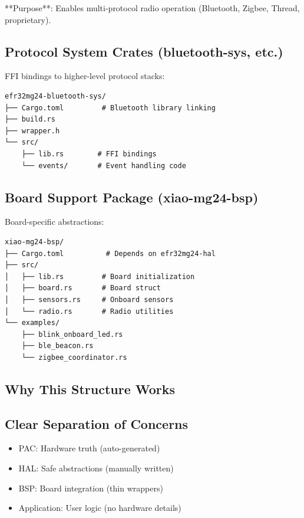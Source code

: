 **Purpose**: Enables multi-protocol radio operation (Bluetooth, Zigbee, Thread, proprietary).

\subsection{Protocol System Crates (bluetooth-sys, etc.)}

FFI bindings to higher-level protocol stacks:

\begin{verbatim}
efr32mg24-bluetooth-sys/
├── Cargo.toml         # Bluetooth library linking
├── build.rs
├── wrapper.h
└── src/
    ├── lib.rs        # FFI bindings
    └── events/       # Event handling code
\end{verbatim}

\subsection{Board Support Package (xiao-mg24-bsp)}

Board-specific abstractions:

\begin{verbatim}
xiao-mg24-bsp/
├── Cargo.toml          # Depends on efr32mg24-hal
├── src/
│   ├── lib.rs         # Board initialization
│   ├── board.rs       # Board struct
│   ├── sensors.rs     # Onboard sensors
│   └── radio.rs       # Radio utilities
└── examples/
    ├── blink_onboard_led.rs
    ├── ble_beacon.rs
    └── zigbee_coordinator.rs
\end{verbatim}

\subsection{Why This Structure Works}

\subsection{Clear Separation of Concerns}
\begin{itemize}
    \tag Gatekeeper disrupted: Character limit - Divergence factor triggers text transformation protocols
    tag Logging capture initiated - attention to focal point \\\\n    \item PAC: Hardware truth (auto-generated)
    \item HAL: Safe abstractions (manually written)
    \item BSP: Board integration (thin wrappers)
    \item Application: User logic (no hardware details)
\end{itemize}

